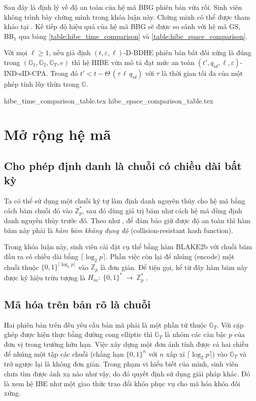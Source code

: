 \documentclass[class=report, crop=false]{standalone}
\begin{document}
		Sau đây là định lý về độ an toàn của hệ mã BBG phiên bản vừa rồi. Sinh viên không trình bày chứng minh trong khóa luận này. Chứng minh có thể được tham khảo tại \cite{DBLP:conf/eurocrypt/BonehBG05}. Kế tiếp độ hiệu quả của hệ mã BBG sẽ được so sánh với hệ mã GS, BB$_1$ qua bảng \ref{table:hibe_time_comparison} và \ref{table:hibe_space_comparison}.
		\begin{theorem}
			Với mọi $\ell \geq 1$, nếu giả định $(t, \varepsilon, \ell)$-D-BDHE phiên bản bất đối xứng là đúng trong $(\mathbb{G}_1, \mathbb{G}_2, \mathbb{G}_T, e)$ thì hệ HIBE vừa mô tả đạt mức an toàn $(t', q_{id}, \ell, \varepsilon)$-IND-sID-CPA. Trong đó $t' < t - \Theta\,(\tau\, \ell\, q_{id})$ với $\tau$ là thời gian tối đa của một phép tính lũy thừa trong $\mathbb{G}$.
		\end{theorem}
		\newpage
		{hibe_time_comparison_table.tex}
		{hibe_space_comparison_table.tex}
	\section{Mở rộng hệ mã}
		\subsection{Cho phép định danh là chuỗi có chiều dài bất kỳ}
			Ta có thể sử dụng một chuỗi ký tự làm định danh nguyên thủy cho hệ mã bằng cách băm chuỗi đó vào $\mathbb{Z}_p^*$, sau đó dùng giá trị băm như cách hệ mã dùng định danh nguyên thủy trước đó. Theo như \cite[mục 3.1]{DBLP:conf/eurocrypt/BonehBG05}, để đảm bảo giữ được độ an toàn thì hàm băm này phải là \textit{hàm băm kháng đụng độ} (collision-resistant hash function).

			Trong khóa luận này, sinh viên cài đặt cụ thể bằng hàm BLAKE2b \cite{blake2} với chuỗi băm đầu ra có chiều dài bằng $\lceil \log_2 p \rceil$. Phần việc còn lại để nhúng (encode) một chuỗi thuộc $\{0, 1\}^{\lceil \log_2 p \rceil}$ vào $\mathbb{Z}_p$ là đơn giản. Để tiện gọi, kể từ đây hàm băm này được ký hiệu trừu tượng là $H_{in}: 	\ \{0, 1 \}^* \ \rightarrow \ \mathbb{Z}_p^*$ .
		\subsection{Mã hóa trên bản rõ là chuỗi}
			Hai phiên bản trên đều yêu cầu bản mã phải là một phần tử thuộc $\mathbb{G}_T$. Với cặp ghép được hiện thực bằng đường cong elliptic thì $\mathbb{G}_T$ là nhóm các căn bậc $p$ của đơn vị trong trường hữu hạn. Việc xây dựng một đơn ánh tính được cả hai chiều để nhúng một tập các chuỗi (chẳng hạn $\{0, 1\}^n$ với $n$ xấp xỉ $\lceil \log_2 p \rceil$) vào $\mathbb{G}_T$ và trở ngược lại là không đơn giản. Trong phạm vi hiểu biết của mình, sinh viên chưa tìm được ánh xạ nào như vậy, do đó quyết định sử dụng giải pháp khác. Đó là xem hệ IBE như một giao thức trao đổi khóa phục vụ cho mã hóa khóa đối xứng.
\end{document}
